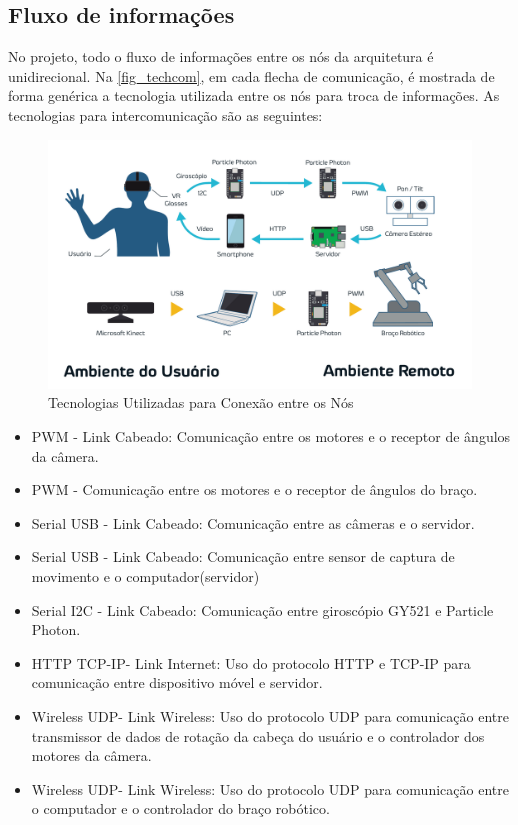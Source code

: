 	\subsection{Fluxo de informações}\label{subsec-fluxo-info}
	No projeto, todo o fluxo de informações entre os nós da arquitetura é unidirecional. Na \autoref{fig_techcom}, em cada flecha de comunicação, é mostrada de forma genérica a tecnologia utilizada entre os nós para troca de informações.
	As tecnologias para intercomunicação são as seguintes:
		\begin{figure}[h!]
		\caption{\label{fig_techcom}  Tecnologias Utilizadas para Conexão entre os Nós}
		\begin{center}
			\includegraphics[width=\textwidth]{techcom.pdf}	
		\end{center}
	\end{figure}
	
	\begin{itemize}[noitemsep]
		\item PWM - Link Cabeado: Comunicação entre os motores e o receptor de ângulos da câmera.
		\item PWM - Comunicação entre os motores e o receptor de ângulos do braço.
		\item Serial USB - Link Cabeado: Comunicação entre as câmeras e o servidor.
		\item Serial USB - Link Cabeado: Comunicação entre sensor de captura de movimento e o computador(servidor)
		\item Serial I2C - Link Cabeado: Comunicação entre giroscópio GY521 e Particle Photon. 
		\item HTTP TCP-IP- Link Internet: Uso do protocolo HTTP e TCP-IP para comunicação entre dispositivo móvel e servidor.
		\item Wireless UDP- Link Wireless: Uso do protocolo UDP  para comunicação entre transmissor de dados de rotação da cabeça do usuário e o controlador dos motores da câmera.
		\item Wireless UDP- Link Wireless: Uso do protocolo UDP  para comunicação entre o computador e o controlador do braço robótico.

	\end{itemize}

